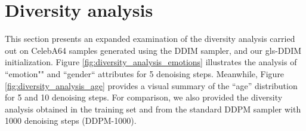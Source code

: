 \clearpage
\section{Diversity analysis}
\label{supp:diversity_analysis}

This section presents an expanded examination of the diversity analysis carried out on  CelebA64 samples generated using the DDIM sampler, and our gls-DDIM initialization. Figure \ref{fig:diversity_analysis_emotions} illustrates the analysis of ``emotion""  and ``gender`` attributes for 5 denoising steps.   Meanwhile, Figure \ref{fig:diversity_analysis_age} provides a visual summary of the ``age''  distribution for 5 and 10 denoising steps. For comparison, we also provided the diversity analysis obtained in the training set and from the standard DDPM  sampler with 1000 denoising steps (DDPM-1000).

